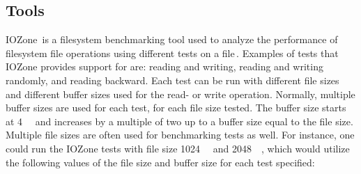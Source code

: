 \subsection{Tools}
IOZone\,\cite{IozoneFilesystemBenchmark} is a filesystem benchmarking tool used to analyze the performance of filesystem file operations using different tests on a file\,\cite{iozoneIozoneFilesystemBenchmark}. Examples of tests that IOZone provides support for are: reading and writing, reading and writing randomly, and reading backward. Each test can be run with different file sizes and different buffer sizes used for the read- or write operation. Normally, multiple buffer sizes are used for each test, for each file size tested. The buffer size starts at \SI{4}{\kilo\byte} and increases by a multiple of two up to a buffer size equal to the file size. Multiple file sizes are often used for benchmarking tests as well. For instance, one could run the IOZone tests with file size \SI{1024}{\kilo\byte} and \SI{2048}{\kilo\byte}, which would utilize the following values of the file size and buffer size for each test specified:
